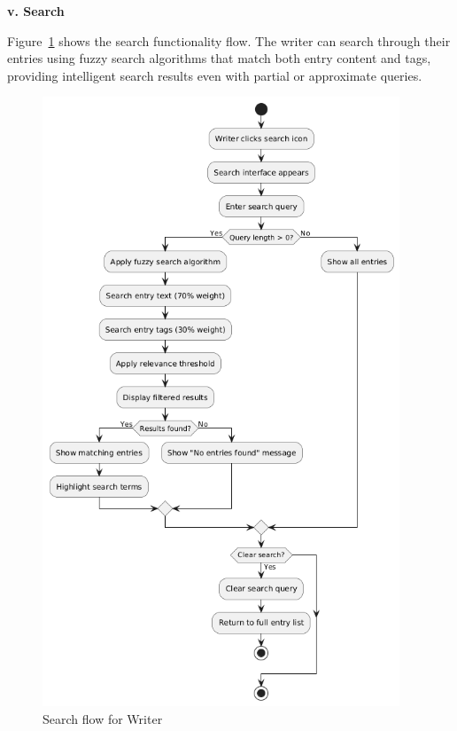 \textbf{v. Search}


Figure~\ref{fig:search-flow} shows the search functionality flow. The writer can search through their entries using fuzzy search algorithms that match both entry content and tags, providing intelligent search results even with partial or approximate queries.

\begin{figure}[H]
\centering
\includegraphics[width=0.95\textwidth,height=0.7\textheight,keepaspectratio]{files/imgs/search_flow.png}
\caption{Search flow for Writer}
\label{fig:search-flow}
\end{figure}
\clearpage

